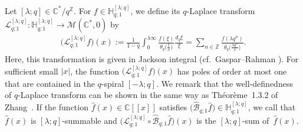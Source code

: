 \documentclass[pdftex]{sigma}
\numberwithin{equation}{section}
\begin{document}
Let $[\lambda;q]\in\mathbb{C}^*/q^{\mathbb{Z}}$. For $f\in\mathbb{H}_{q;1}^{[\lambda;q]}$, we define its $q$-Laplace transform $\mathcal{L}_{q;1}^{[\lambda;q]}\colon \mathbb{H}_{q;1}^{[\lambda;q]}\to\mathcal{M}(\mathbb{C}^*,0)$ by
\begin{gather*}
\big(\mathcal{L}_{q;1}^{[\lambda;q]}f\big)(x):=\frac{1}{1-q}\int_{0}^{\lambda\infty}\frac{f(\xi)}{\theta_q\big(\frac{\xi}{x}\big)}\frac{d_q\xi}{\xi}=\sum_{n\in\mathbb{Z}}\frac{f(\lambda q^n)}{\theta_q\big(\frac{\lambda q^n}{x}\big)}.
\end{gather*}
Here, this transformation is given in Jackson integral (cf.\ Gaspar--Rahman \cite[Section~1.10]{Gasper&Rahman2004}). For sufficient small $|x|$, the function $\big(\mathcal{L}_{q;1}^{[\lambda;q]}f\big)(x)$ has poles of order at most one that are contained in the $q$-spiral $[-\lambda;q]$. We remark that the well-definedness of $q$-Laplace transform can be shown in the same way as Th\'eor\`eme~1.3.2 of Zhang~\cite{Zhang2002}. If the function $\hat{f}(x)\in\mathbb{C}[[x]]$ satisfies $\big(\hat{\mathcal{B}}_{q;1}\hat{f}\big)\in\mathbb{H}_{q;1}^{[\lambda;q]}$, we call that $\hat{f}(x)$ is $[\lambda;q]$-summable and $\big(\mathcal{L}_{q;1}^{[\lambda;q]}\circ\hat{\mathcal{B}}_{q;1}\hat{f}\big)(x)$ is the $[\lambda;q]$-sum of~$\hat{f}(x)$.
\end{document}
